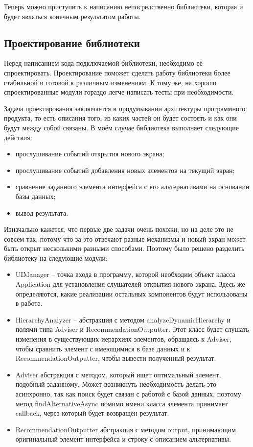 \documentclass[a4paper,14pt]{extarticle} %
\begin{document}
	Теперь можно приступить к написанию непосредственно библиотеки, которая и будет являться конечным результатом работы.
	
	\subsection{Проектирование библиотеки}
	
	Перед написанием кода подключаемой библиотеки, необходимо её спроектировать. Проектирование поможет сделать работу библиотеки более стабильной и готовой к различным изменениям. К тому же, на хорошо спроектированные модули гораздо легче написать тесты при необходимости. 
	
	Задача проектирования заключается в продумывании архитектуры программного продукта, то есть описания того, из каких частей он будет состоять и как они будут между собой связаны. В моём случае библиотека выполняет следующие действия:
	\begin{itemize}
		\item прослушивание событий открытия нового экрана;
		\item прослушивание событий добавления новых элементов на текущий экран;
		\item сравнение заданного элемента интерфейса с его альтернативами на основании базы данных;
		\item вывод результата.
	\end{itemize}
	Изначально кажется, что первые две задачи очень похожи, но на деле это не совсем так, потому что за это отвечают разные механизмы и новый экран может быть открыт несколькими разными способами. Поэтому было решено разделить библиотеку на следующие модули:
	\begin{itemize}
		\item UIManager – точка входа в программу, которой необходим объект класса Application для установления слушателей открытия нового экрана. Здесь же определяются, какие реализации остальных компонентов будут использованы в работе.
		\item HierarchyAnalyzer – абстракция с методом analyzeDynamicHierarchy и полями типа Adviser и RecommendationOutputter. Этот класс будет слушать изменения в существующих иерархиях элементов, обращаясь к Adviser, чтобы сравнить элемент с имеющимися в базе данных и к RecommendationOutputter, чтобы вывести полученный результат.
		\item Adviser абстракция с методом, который ищет оптимальный элемент, подобный заданному. Может возникнуть необходимость делать это асинхронно, так как поиск будет связан с работой с базой данных, поэтому метод findAlternativeAsync помимо имени класса элемента принимает callback, через который будет возвращён результат.
		\item RecommendationOutputter абстракция с методом output, принимающим оригинальный элемент интерфейса и строку с описанием альтернативы.
	\end{itemize}
	
\end{document}
